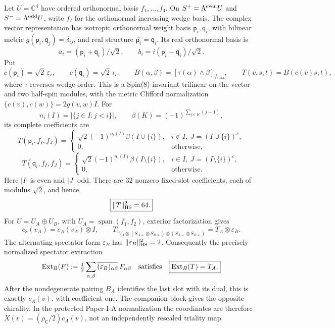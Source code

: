 \documentclass[11pt]{article}
\begin{document}
\begin{theorem}
\label{p1:thm:v214-normalized-spin8-triality}
Let \(U=\mathbb C^4\) have ordered orthonormal basis \(f_1,\ldots,f_4\).
On \(S^+=\Lambda^{\rm even}U\) and \(S^-=\Lambda^{\rm odd}U\),
write \(f_I\) for the orthonormal increasing wedge basis.
The complex vector representation has isotropic orthonormal weight
basis \(\mathsf p_i,\mathsf q_i\), with bilinear metric
\(g(\mathsf p_i,\mathsf q_j)=\delta_{ij}\), and real structure
\(\overline{\mathsf p_i}=\mathsf q_i\). Its real orthonormal basis is
\[
 a_i=(\mathsf p_i+\mathsf q_i)/\sqrt2,\qquad
 b_i=i(\mathsf p_i-\mathsf q_i)/\sqrt2.
\]
Put
\[
 c(\mathsf p_i)=\sqrt2\,\varepsilon_i,\qquad
 c(\mathsf q_i)=\sqrt2\,\iota_i,\qquad
 B(\alpha,\beta)=[\tau(\alpha)\wedge\beta]_{f_{1234}},
 \qquad T(v,s,t)=B(c(v)s,t),
\]
where \(\tau\) reverses wedge order.
This is a Spin(8)-invariant trilinear on the vector and two half-spin
modules, with the metric Clifford normalization
\(\{c(v),c(w)\}=2g(v,w)I\). For
\[
 n_i(I)=|\{j\in I:j<i\}|,\qquad
 \beta(K)=(-1)^{\sum_{j\in K}(j-1)},
\]
its complete coefficients are
\[
 T(\mathsf p_i,f_I,f_J)=
 \begin{cases}
 \sqrt2(-1)^{n_i(I)}\beta(I\cup\{i\}),
  &i\notin I,\ J=(I\cup\{i\})^c,\\
 0,&\text{otherwise},
 \end{cases}
\]
\[
 T(\mathsf q_i,f_I,f_J)=
 \begin{cases}
 \sqrt2(-1)^{n_i(I)}\beta(I\setminus\{i\}),
  &i\in I,\ J=(I\setminus\{i\})^c,\\
 0,&\text{otherwise}.
 \end{cases}
\]
Here \(|I|\) is even and \(|J|\) odd. There are \(32\) nonzero
fixed-slot coefficients, each of modulus \(\sqrt2\), and hence
\[
 \boxed{\|T\|_{\rm HS}^2=64.}
\]
For \(U=U_A\oplus U_B\), with
\(U_A=\operatorname{span}(f_1,f_2)\), exterior factorization gives
\[
 c_8(v_A)=c_A(v_A)\otimes I,\qquad
 T|_{V_A\otimes(S_{A+}\otimes S_{B+})
                 \otimes(S_{A-}\otimes S_{B+})}
 =T_A\otimes\varepsilon_B.
\]
The alternating spectator form \(\varepsilon_B\) has
\(\|\varepsilon_B\|_{\rm HS}^2=2\). Consequently the precisely
normalized spectator extraction
\[
 \operatorname{Ext}_B(F)
 :=\tfrac12\sum_{\alpha,\beta}
   \overline{(\varepsilon_B)_{\alpha\beta}}\,
                 F_{\alpha\beta}
 \quad\hbox{satisfies}\quad
 \boxed{\operatorname{Ext}_B(T)=T_A.}
\]
After the nondegenerate pairing \(B_A\) identifies the last slot
with its dual, this is exactly \(c_A(v)\), with coefficient one.
The companion block gives the opposite chirality.
In the protected Paper-I-A normalization the coordinates are therefore
\(X(v)=(\rho_{\mathsf C}/2)c_A(v)\), not an independently
rescaled triality map.
\end{theorem}
\end{document}
